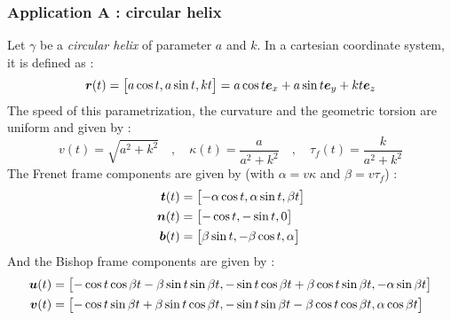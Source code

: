 \subsubsection{Application A : circular helix}
Let $\gamma$ be a \emph{circular helix} of parameter $a$ and $k$. In a cartesian coordinate system, it is defined as :
\begin{equation}
	\boldsymbol{r}(t) 
	=
	\begin{bmatrix}
		a \cos t, a \sin t, k t
	\end{bmatrix}
	= a \cos t \boldsymbol{e}_x + a \sin t \boldsymbol{e}_y + k t \boldsymbol{e}_z
\end{equation}
The speed of this parametrization, the curvature and the geometric torsion are uniform and given by :
\begin{equation}
	v(t) = \sqrt{a^2+k^2}
	\quad,\quad
	\kappa(t) = \frac{a}{a^2 + k^2}
	\quad,\quad
	\tau_f(t) = \frac{k}{a^2 + k^2}
\end{equation}
The Frenet frame components are given by (with $\alpha = v \kappa$ and $\beta = v \tau_f$) :
\begin{equation}
	\begin{aligned}
	\boldsymbol{t}(t) &=
		\begin{bmatrix} 
			- \alpha \cos t, \alpha \sin t, \beta t 
		\end{bmatrix}
	\\
	\boldsymbol{n}(t) &= 
		\begin{bmatrix} 
			-\cos t, -\sin t, 0 
		\end{bmatrix}
	\\
	\boldsymbol{b}(t) &=
		\begin{bmatrix} 
			\beta \sin t, - \beta \cos t, \alpha
	\end{bmatrix} 	
	\end{aligned}
\end{equation}
And the Bishop frame components are given by :
\begin{equation}
	\begin{aligned}
		\boldsymbol{u}(t) &= 
		\begin{bmatrix} 	
			-\cos t \cos \beta t - \beta  \sin t \sin \beta t, -\sin t \cos \beta t + \beta  \cos t \sin \beta t, - \alpha \sin \beta t
		\end{bmatrix}
		\\
		\boldsymbol{v}(t) &= 
		\begin{bmatrix} 
			-\cos t \sin \beta t + \beta  \sin t \cos \beta t, -\sin t \sin \beta t - \beta  \cos t \cos \beta t, \alpha \cos \beta t
		\end{bmatrix}
	\end{aligned}
\end{equation}




